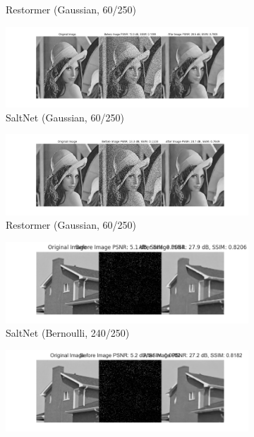 \begin{figure}[htpb]
\begin{subfigure}{0.48\textwidth}
        \caption{Restormer (Gaussian, 60/250)}
    \end{subfigure}
    \begin{subfigure}{0.48\textwidth}
        \centering
        \includegraphics[width=\textwidth]{assets/60_gau_saltnet.png}
        \caption{SaltNet (Gaussian, 60/250)}
    \end{subfigure}
    \hfill
    \begin{subfigure}{0.48\textwidth}
        \centering
        \includegraphics[width=\textwidth]{assets/60_gau_restormer.png}
        \caption{Restormer (Gaussian, 60/250)}
    \end{subfigure}
    \begin{subfigure}{0.48\textwidth}
        \centering
        \includegraphics[width=\textwidth]{assets/240_bern_saltnet.png}
        \caption{SaltNet (Bernoulli, 240/250)}
    \end{subfigure}
    \hfill
    \begin{subfigure}{0.48\textwidth}
        \centering
        \includegraphics[width=\textwidth]{assets/240_bern_restormer.png}

\end{subfigure}
\end{figure}
